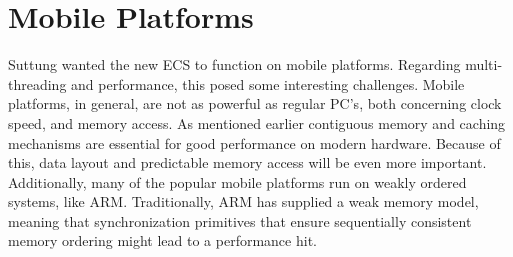 \section{Mobile Platforms}
\label{sec:requirements_mobile_platforms}
Suttung wanted the new ECS to function on mobile platforms.
Regarding multi-threading and performance, this posed some interesting challenges.
Mobile platforms, in general, are not as powerful as regular PC's, both concerning clock speed, and memory access.
As mentioned earlier contiguous memory and caching mechanisms are essential for good performance on modern hardware.
Because of this, data layout and predictable memory access will be even more important\cite[10:38]{andrei_alexandrescu_quick_code_quickly}.
Additionally, many of the popular mobile platforms run on weakly ordered systems, like ARM\cite{preshing_weak_vs_strong_memory_models}.
Traditionally, ARM has supplied a weak memory model, meaning that synchronization primitives that ensure sequentially consistent memory ordering might lead to a performance hit. 

